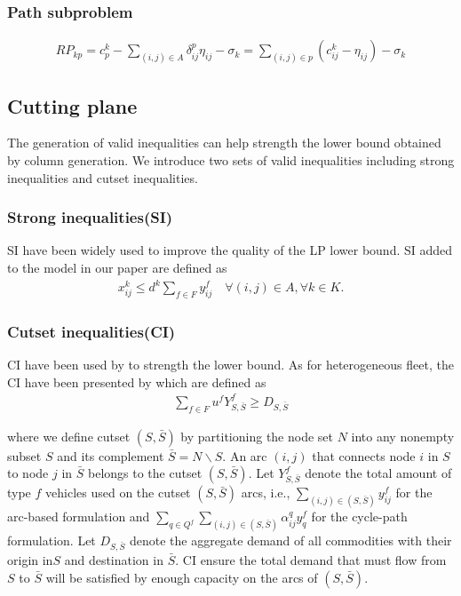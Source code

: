 \documentclass[11pt,nonblindrev,fleqn]{article}
\begin{document}
\subsubsection{Path subproblem}

\begin{align}
RP_{kp} = c_p^k - \sum_{(i,j)\in A} \delta_{ij}^p \eta_{ij} - \sigma_k = \sum_{(i,j)\in p} (c_{ij}^k - \eta_{ij}) - \sigma_k
\end{align}

\subsection{Cutting plane}
The generation of valid inequalities can help strength the lower bound obtained by column generation. We introduce two sets of valid inequalities including strong inequalities and cutset inequalities.

\subsubsection{Strong inequalities(SI)}
SI have been widely used to improve the quality of the LP lower bound. SI added to the model in our paper are defined as
\begin{align}
  x_{ij}^k \leq d^k \sum_{f\in F} y_{ij}^f      \quad       \forall (i,j)\in A, \forall k\in K.
\end{align}

\subsubsection{Cutset inequalities(CI)}
CI have been used by \cite{Chouman2015Cutting} to strength the lower bound. As for heterogeneous fleet, the CI have been presented by \cite{Kim1999Multimodal} which are defined as
\begin{align}
    \sum_{f\in F}u^f Y_{S,\bar{S}}^f \geq  D_{S,\bar{S}}
\end{align}

where we define cutset $(S,\bar{S})$ by partitioning the node set $N$ into any nonempty subset $S$ and its complement $\bar{S}=N\backslash S$. An arc $(i,j)$ that connects node $i$ in $S$ to node $j$ in $\bar{S}$  belongs to the cutset $(S,\bar{S})$. Let $Y_{S,\bar{S}}^f$ denote the total amount of type $f$ vehicles used on the cutset $(S,\bar{S})$ arcs, i.e., $\sum_{(i,j)\in (S,\bar{S})} y_{ij}^f$ for the arc-based formulation and $\sum_{q\in Q^f}\sum_{(i,j)\in (S,\bar{S})} \alpha_{ij}^q y_q^f $ for the cycle-path formulation. Let $D_{S,\bar{S}}$ denote the aggregate demand of all commodities with their origin in$S$ and destination in $\bar{S}$. CI ensure the total demand that must flow from $S$ to $\bar{S}$ will be satisfied by enough capacity on the arcs of $(S,\bar{S})$.
\end{document}
